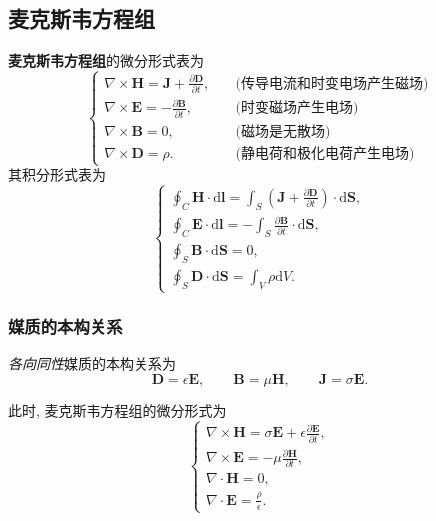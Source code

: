 \subsection{麦克斯韦方程组}
\textbf{麦克斯韦方程组}的微分形式表为
\begin{equation}
    \begin{cases}
        \nabla\times\bm{H}=\bm{J}+\frac{\partial\bm{D}}{\partial t}, & \quad \text{(传导电流和时变电场产生磁场)} \\
        \nabla\times\bm{E}=-\frac{\partial\bm{B}}{\partial t},       & \quad \text{(时变磁场产生电场)}      \\
        \nabla\times\bm{B}=0,                                        & \quad \text{(磁场是无散场)}        \\
        \nabla\times\bm{D}=\rho.                                     & \quad \text{(静电荷和极化电荷产生电场)}
    \end{cases}
\end{equation}
其积分形式表为
\begin{equation}
    \begin{cases}
        \oint_C\bm{H}\cdot\mathrm{d}\bm{l}=\int_S\left(\bm{J}+\frac{\partial\bm{D}}{\partial t}\right)\cdot\mathrm{d}\bm{S}, \\
        \oint_C\bm{E}\cdot\mathrm{d}\bm{l}=-\int_S\frac{\partial\bm{B}}{\partial t}\cdot\mathrm{d}\bm{S},                    \\
        \oint_S\bm{B}\cdot\mathrm{d}\bm{S}=0,                                                                                \\
        \oint_S\bm{D}\cdot\mathrm{d}\bm{S}=\int_V\rho\mathrm{d}V.
    \end{cases}
\end{equation}

\subsubsection{媒质的本构关系}
\textit{各向同性}媒质的本构关系为
\begin{equation}
    \bm{D}=\epsilon\bm{E}, \qquad \bm{B}=\mu\bm{H}, \qquad \bm{J}=\sigma\bm{E}.
\end{equation}

此时, 麦克斯韦方程组的微分形式为
\begin{equation}
    \begin{cases}
        \nabla\times\bm{H}=\sigma\bm{E}+\epsilon\frac{\partial\bm{E}}{\partial t}, \\
        \nabla\times\bm{E}=-\mu\frac{\partial\bm{H}}{\partial t},                  \\
        \nabla\cdot\bm{H}=0,                                                       \\
        \nabla\cdot\bm{E}=\frac{\rho}{\epsilon}.
    \end{cases}
\end{equation}

